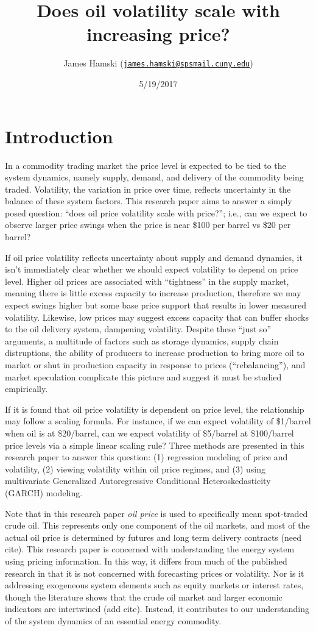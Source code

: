 \documentclass[11pt,]{article}
\title{Does oil volatility scale with increasing price?}
\author{James Hamski
(\href{mailto:james.hamski@spsmail.cuny.edu}{\nolinkurl{james.hamski@spsmail.cuny.edu}})}
\date{5/19/2017}
\begin{document}
\maketitle

\section{Introduction}\label{introduction}

In a commodity trading market the price level is expected to be tied to
the system dynamics, namely supply, demand, and delivery of the
commodity being traded. Volatility, the variation in price over time,
reflects uncertainty in the balance of these system factors. This
research paper aims to answer a simply posed question: ``does oil price
volatility scale with price?''; i.e., can we expect to observe larger
price swings when the price is near \$100 per barrel vs \$20 per barrel?

If oil price volatility reflects uncertainty about supply and demand
dynamics, it isn't immediately clear whether we should expect volatility
to depend on price level. Higher oil prices are associated with
``tightness'' in the supply market, meaning there is little excess
capacity to increase production, therefore we may expect swings higher
but some base price support that results in lower measured volatility.
Likewise, low prices may suggest excess capacity that can buffer shocks
to the oil delivery system, dampening volatility. Despite these ``just
so'' arguments, a multitude of factors such as storage dynamics, supply
chain distruptions, the ability of producers to increase production to
bring more oil to market or shut in production capacity in response to
prices (``rebalancing''), and market speculation complicate this picture
and suggest it must be studied empirically.

If it is found that oil price volatility is dependent on price level,
the relationship may follow a scaling formula. For instance, if we can
expect volatility of \$1/barrel when oil is at \$20/barrel, can we
expect volatility of \$5/barrel at \$100/barrel price levels via a
simple linear scaling rule? Three methods are presented in this research
paper to answer this question: (1) regression modeling of price and
volatility, (2) viewing volatility within oil price regimes, and (3)
using multivariate Generalized Autoregressive Conditional
Heteroskedasticity (GARCH) modeling.

Note that in this research paper \emph{oil price} is used to
specifically mean spot-traded crude oil. This represents only one
component of the oil markets, and most of the actual oil price is
determined by futures and long term delivery contracts (need cite). This
research paper is concerned with understanding the energy system using
pricing information. In this way, it differs from much of the published
research in that it is not concerned with forecasting prices or
volatility. Nor is it addressing exogeneous system elements such as
equity markets or interest rates, though the literature shows that the
crude oil market and larger economic indicators are intertwined (add
cite). Instead, it contributes to our understanding of the system
dynamics of an essential energy commodity.
\end{document}
